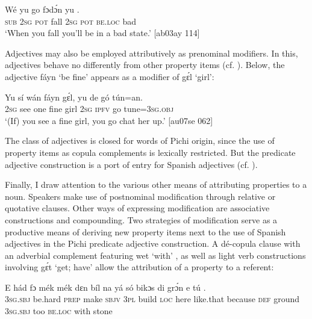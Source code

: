 \ea%
    \label{ex:key:836}
    \gll Wé  yu  go  fɔdɔ́n  yu        .\\
\textsc{sub}  \textsc{2sg}  \textsc{pot}  fall    \textsc{2sg}  \textsc{pot}  \textsc{be.loc}  bad\\

\glt ‘When you fall you’ll be in a bad state.’ [ab03ay 114]
\z

Adjectives may also be employed attributively as prenominal modifiers. In this, adjectives behave no differently from other property items (cf. ). Below, the adjective fáyn ‘be fine’ appears as a modifier of gɛ́l ‘girl’: 


\ea%
    \label{ex:key:837}
    \gll Yu  sí  wán    fáyn  gɛ́l,  yu  de  gó  tún=an.\\
\textsc{2sg}  see  one    fine    girl  \textsc{2sg}  \textsc{ipfv}  go  tune=\textsc{3sg.obj}\\

\glt ‘(If) you see a fine girl, you go chat her up.’ [au07se 062]
\z

The class of adjectives is closed for words of Pichi origin, since the use of property items as copula complements is lexically restricted. But the predicate adjective construction is a port of entry for Spanish adjectives (cf. ). 


Finally, I draw attention to the various other means of attributing properties to a noun. Speakers make use of postnominal modification through relative or quotative clause{\fff}s. Other ways of expressing modification are associative constructions and compounding{\fff}. Two strategies of modification serve as a productive means of deriving new property items next to the use of Spanish adjectives in the Pichi predicate adjective construction. A dé-copula clause with an adverbial complement {\fff}featuring wet ‘with’ , as well as light verb constructions involving gɛ́t ‘get; have’  allow the attribution of a property to a referent: 



\ea%
    \label{ex:key:838}
    \gll E    hád    fɔ  mék    mék    dɛn  bíl    na  yá    só  bikɔs
di  grɔ́n    e    tú          .\\
\textsc{3sg.sbj}  be.hard  \textsc{prep}  make  \textsc{sbjv}    \textsc{3pl}  build  \textsc{loc}  here    like.that  because
\textsc{def}  ground  \textsc{3sg.sbj}  too  \textsc{be.loc}  with    stone\\

